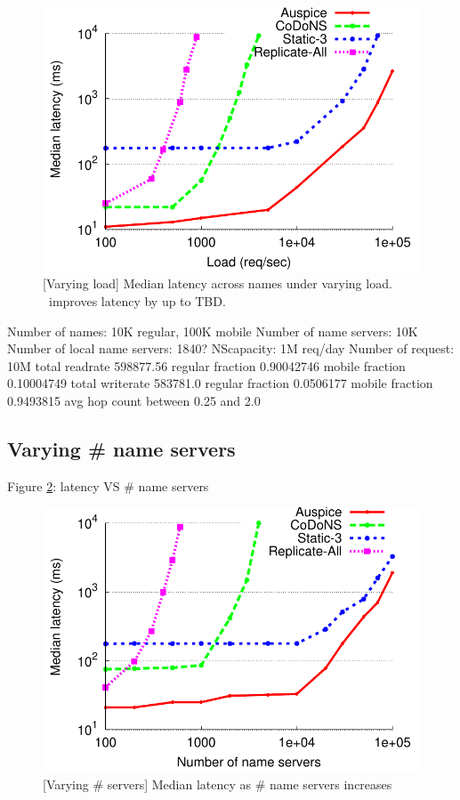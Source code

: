 \begin{figure}[t]
\centering
\includegraphics[scale=0.5]{graph/medianlatencyVSload.pdf}
\caption{[Varying load] Median latency across names under varying load. \auspice\ improves latency by up to TBD.}
\label{fig:meanlatencyvsload}
\end{figure}
Number of names: 10K regular, 100K mobile
Number of name servers: 10K
Number of local name servers: 1840?
NScapacity: 1M req/day
Number of request: 10M
total readrate 598877.56 regular fraction 0.90042746 mobile fraction 0.10004749
total writerate 583781.0 regular fraction 0.0506177 mobile fraction 0.9493815
avg hop count between 0.25 and 2.0


\subsection{Varying \# name servers}
\label{sim:numns}

Figure \ref{fig:numberNS}: latency VS \# name servers

\begin{figure}[t]
\centering
\includegraphics[scale=0.5]{graph/medianlatencyVSnumns.pdf}
\caption{[Varying \# servers] Median latency as \# name servers increases}
\label{fig:numberNS}
\end{figure}

